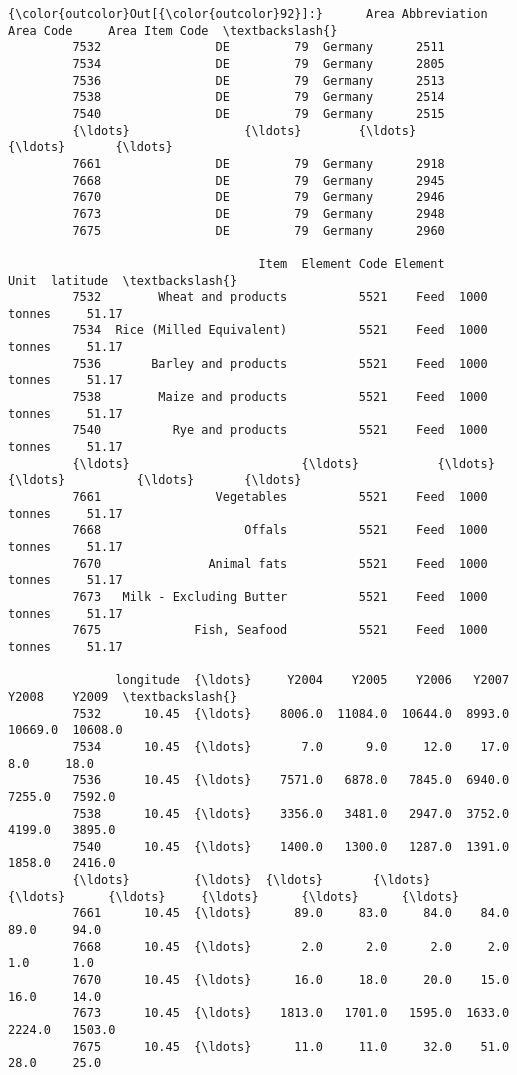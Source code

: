 \documentclass[11pt]{article}
\begin{document}
\begin{Verbatim}[commandchars=\\\{\}]
{\color{outcolor}Out[{\color{outcolor}92}]:}      Area Abbreviation  Area Code     Area Item Code  \textbackslash{}
         7532                DE         79  Germany      2511   
         7534                DE         79  Germany      2805   
         7536                DE         79  Germany      2513   
         7538                DE         79  Germany      2514   
         7540                DE         79  Germany      2515   
         {\ldots}                {\ldots}        {\ldots}      {\ldots}       {\ldots}   
         7661                DE         79  Germany      2918   
         7668                DE         79  Germany      2945   
         7670                DE         79  Germany      2946   
         7673                DE         79  Germany      2948   
         7675                DE         79  Germany      2960   
         
                                   Item  Element Code Element         Unit  latitude  \textbackslash{}
         7532        Wheat and products          5521    Feed  1000 tonnes     51.17   
         7534  Rice (Milled Equivalent)          5521    Feed  1000 tonnes     51.17   
         7536       Barley and products          5521    Feed  1000 tonnes     51.17   
         7538        Maize and products          5521    Feed  1000 tonnes     51.17   
         7540          Rye and products          5521    Feed  1000 tonnes     51.17   
         {\ldots}                        {\ldots}           {\ldots}     {\ldots}          {\ldots}       {\ldots}   
         7661                Vegetables          5521    Feed  1000 tonnes     51.17   
         7668                    Offals          5521    Feed  1000 tonnes     51.17   
         7670               Animal fats          5521    Feed  1000 tonnes     51.17   
         7673   Milk - Excluding Butter          5521    Feed  1000 tonnes     51.17   
         7675             Fish, Seafood          5521    Feed  1000 tonnes     51.17   
         
               longitude  {\ldots}     Y2004    Y2005    Y2006   Y2007    Y2008    Y2009  \textbackslash{}
         7532      10.45  {\ldots}    8006.0  11084.0  10644.0  8993.0  10669.0  10608.0   
         7534      10.45  {\ldots}       7.0      9.0     12.0    17.0      8.0     18.0   
         7536      10.45  {\ldots}    7571.0   6878.0   7845.0  6940.0   7255.0   7592.0   
         7538      10.45  {\ldots}    3356.0   3481.0   2947.0  3752.0   4199.0   3895.0   
         7540      10.45  {\ldots}    1400.0   1300.0   1287.0  1391.0   1858.0   2416.0   
         {\ldots}         {\ldots}  {\ldots}       {\ldots}      {\ldots}      {\ldots}     {\ldots}      {\ldots}      {\ldots}   
         7661      10.45  {\ldots}      89.0     83.0     84.0    84.0     89.0     94.0   
         7668      10.45  {\ldots}       2.0      2.0      2.0     2.0      1.0      1.0   
         7670      10.45  {\ldots}      16.0     18.0     20.0    15.0     16.0     14.0   
         7673      10.45  {\ldots}    1813.0   1701.0   1595.0  1633.0   2224.0   1503.0   
         7675      10.45  {\ldots}      11.0     11.0     32.0    51.0     28.0     25.0   
         

\end{Verbatim}
\end{document}
